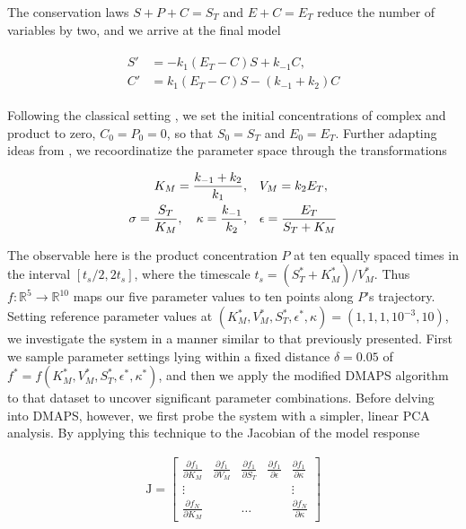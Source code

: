 The conservation laws $S + P + C = S_T$ and $E + C = E_T$ reduce the
number of variables by two, and we arrive at the final model

\begin{align}
  \begin{split}
    S' &= -k_1 (E_T-C) S + k_{-1} C , \\
    C' &= k_1 (E_T-C) S - (k_{-1} + k_2) C
    \label{eq:MM}
  \end{split}
\end{align}

Following the classical setting
\cite{johnson_original_2011,johnson_original_2011,segel_quasi-steady-state_1989},
we set the initial concentrations of complex and product to zero,
$C_0=P_0=0$, so that $S_0 = S_T$ and $E_0 = E_T$.  Further adapting
ideas from \cite{segel_quasi-steady-state_1989}, we recoordinatize the
parameter space through the transformations

\begin{align}
  \begin{split}
    K_M = \displaystyle\frac{k_{-1} + k_2}{k_1} , &\quad
    V_M = k_2 E_T , \\
    \sigma = \displaystyle\frac{S_T}{K_M} , \quad \kappa =
    \displaystyle\frac{k_{-1}}{k_2} , &\quad \epsilon = \displaystyle\frac{E_T}{S_T +
      K_M}
    \label{eq:param-defs}
  \end{split}
\end{align}

The observable here is the product concentration $P$ at ten equally
spaced times in the interval $[t_s/2,2t_s]$, where the timescale
$t_s = (S_T^* + K_M^*)/V_M^*$. Thus
$f:\mathbb{R}^5 \rightarrow \mathbb{R}^{10}$ maps our five
parameter values to ten points along $P$'s trajectory. Setting
reference parameter values at
$(K_M^*,V_M^*,S_T^*,\epsilon^*,\kappa) = (1,1,1,10^{-3},10)$, we
investigate the system in a manner similar to that previously
presented.  First we sample parameter settings lying within a fixed
distance $\delta=0.05$ of
$f^* = f(K_M^*, V_M^*, S_T^*, \epsilon^*,
\kappa^*)$, and then we apply the modified DMAPS algorithm to that
dataset to uncover significant parameter combinations.  Before delving
into DMAPS, however, we first probe the system with a simpler, linear
PCA analysis.  By applying this technique to the Jacobian of the model
response

\begin{align}
  \mathrm{J} = \begin{bmatrix} \frac{\partial f_1}{\partial K_M} &
    \frac{\partial f_1}{\partial V_M} & \frac{\partial f_1}{\partial
      S_T} & \frac{\partial f_1}{\partial \epsilon} & \frac{\partial
      f_1}{\partial \kappa} \\ \vdots & & & & \vdots \\ \frac{\partial
      f_N}{\partial K_M} & & \hdots & & \frac{\partial f_N}{\partial
      \kappa} \end{bmatrix}
\end{align}


